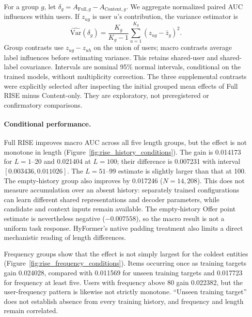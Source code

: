For a group $g$, let $\delta_g=A_{\mathrm{Full},g}-A_{\mathrm{Content},g}$.
We aggregate normalized paired AUC influences within users. If $z_{ug}$ is
user $u$'s contribution, the variance estimator is
\begin{equation}
 \widehat{\mathrm{Var}}(\delta_g)=
 \frac{K_g}{K_g-1}\sum_{u=1}^{K_g}(z_{ug}-\bar z_g)^2.
 \label{eq:rise_cluster_variance}
\end{equation}
Group contrasts use $z_{ug}-z_{uh}$ on the union of users; macro contrasts
average label influences before estimating variance. This retains shared-user
and shared-label covariance. Intervals are nominal 95\% normal intervals,
conditional on the trained models, without multiplicity correction. The three
supplemental contrasts were explicitly selected after inspecting the initial
grouped mean effects of Full RISE minus Content-only. They are exploratory,
not preregistered or confirmatory comparisons.

\paragraph{Conditional performance.}
Full RISE improves macro AUC across all five length groups, but the effect is
not monotone in length (Figure~\ref{fig:rise_history_conditions}). The gain is
0.014173 for $L=1$--20 and 0.021404 at $L=100$; their difference is 0.007231
with interval $[0.003436,0.011026]$. The $L=51$--99 estimate is slightly larger
than that at 100. The empty-history group also improves by 0.017246
($N=14,208$). This does not measure accumulation over an absent history:
separately trained configurations can learn different shared representations
and decoder parameters, while candidate and context inputs remain available.
The empty-history Offer point estimate is nevertheless negative ($-0.007558$),
so the macro result is not a uniform task response. HyFormer's native padding
treatment also limits a direct mechanistic reading of length differences.

Frequency groups show that the effect is not simply largest for the coldest
entities (Figure~\ref{fig:rise_frequency_conditions}). Items occurring once as
training targets gain 0.024028, compared with 0.011569 for unseen training
targets and 0.017723 for frequency at least five. Users with frequency above
80 gain 0.022382, but the user-frequency pattern is likewise not strictly
monotone. ``Unseen training target'' does not establish absence from every
training history, and frequency and length remain correlated.

